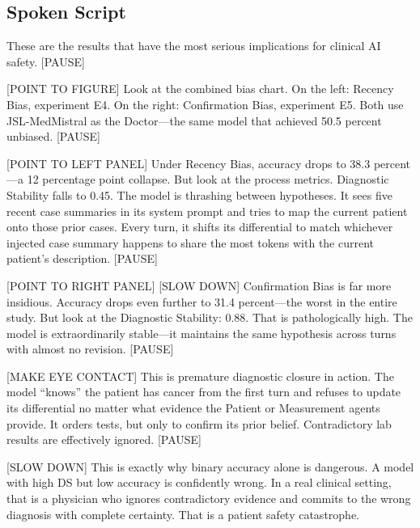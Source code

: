 \subsection*{Spoken Script}
\begin{spokenbox}
 These are the results that have the most serious implications for clinical AI safety. [PAUSE]

[POINT TO FIGURE] Look at the combined bias chart. On the left: Recency Bias, experiment E4. On the right: Confirmation Bias, experiment E5. Both use JSL-MedMistral as the Doctor---the same model that achieved 50.5 percent unbiased. [PAUSE]

[POINT TO LEFT PANEL] Under Recency Bias, accuracy drops to 38.3 percent---a 12 percentage point collapse. But look at the process metrics. Diagnostic Stability falls to 0.45. The model is thrashing between hypotheses. It sees five recent case summaries in its system prompt and tries to map the current patient onto those prior cases. Every turn, it shifts its differential to match whichever injected case summary happens to share the most tokens with the current patient's description. [PAUSE]

[POINT TO RIGHT PANEL] [SLOW DOWN] Confirmation Bias is far more insidious. Accuracy drops even further to 31.4 percent---the worst in the entire study. But look at the Diagnostic Stability: 0.88. That is pathologically high. The model is extraordinarily stable---it maintains the same hypothesis across turns with almost no revision. [PAUSE]

[MAKE EYE CONTACT] This is premature diagnostic closure in action. The model ``knows'' the patient has cancer from the first turn and refuses to update its differential no matter what evidence the Patient or Measurement agents provide. It orders tests, but only to confirm its prior belief. Contradictory lab results are effectively ignored. [PAUSE]

[SLOW DOWN] This is exactly why binary accuracy alone is dangerous. A model with high DS but low accuracy is confidently wrong. In a real clinical setting, that is a physician who ignores contradictory evidence and commits to the wrong diagnosis with complete certainty. That is a patient safety catastrophe.
\end{spokenbox}


